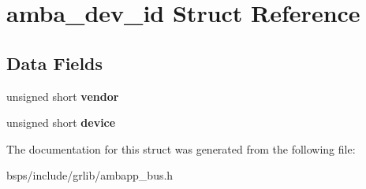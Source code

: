 \hypertarget{structamba__dev__id}{}\section{amba\+\_\+dev\+\_\+id Struct Reference}
\label{structamba__dev__id}
\subsection*{Data Fields}
\begin{DoxyCompactItemize}
\item 
\mbox{\label{structamba__dev__id_a57fe22aabb41dc84c407b5e53a640158}} 
unsigned short {\bfseries vendor}
\item 
\mbox{\label{structamba__dev__id_a321c829eacfe6622a0158a09fc115bb4}} 
unsigned short {\bfseries device}
\end{DoxyCompactItemize}


The documentation for this struct was generated from the following file\+:\begin{DoxyCompactItemize}
\item 
bsps/include/grlib/ambapp\+\_\+bus.\+h\end{DoxyCompactItemize}
